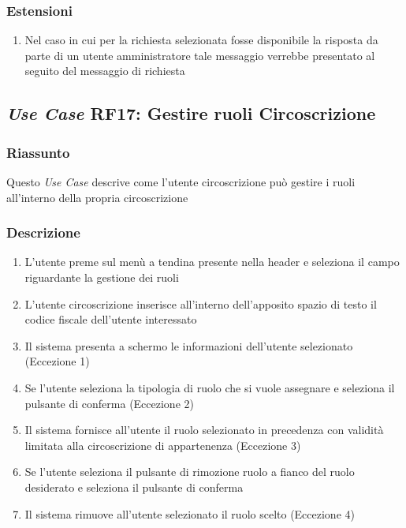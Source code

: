         \subsubsection{Estensioni}
            \begin{enumerate}
                \item Nel caso in cui per la richiesta selezionata fosse disponibile la risposta da parte di un utente amministratore tale messaggio verrebbe presentato al seguito del messaggio di richiesta 
            \end{enumerate}

    \subsection{\textit{Use Case} RF17: Gestire ruoli Circoscrizione}
        \subsubsection{Riassunto}
            Questo \textit{Use Case} descrive come l'utente circoscrizione può gestire i ruoli all'interno della propria circoscrizione
        \subsubsection{Descrizione}
            \begin{enumerate}
                \item L'utente preme sul menù a tendina presente nella header e seleziona il campo riguardante la gestione dei ruoli
                \item L'utente circoscrizione inserisce all'interno dell'apposito spazio di testo il codice fiscale dell'utente interessato
                \item Il sistema presenta a schermo le informazioni dell'utente selezionato (Eccezione 1)
                \item Se l'utente seleziona la tipologia di ruolo che si vuole assegnare e seleziona il pulsante di conferma (Eccezione 2)
                \item Il sistema fornisce all'utente il ruolo selezionato in precedenza con validità limitata alla circoscrizione di appartenenza (Eccezione 3)
                \item Se l'utente seleziona il pulsante di rimozione ruolo a fianco del ruolo desiderato e seleziona il pulsante di conferma
                \item Il sistema rimuove all'utente selezionato il ruolo scelto (Eccezione 4)
            \end{enumerate}
